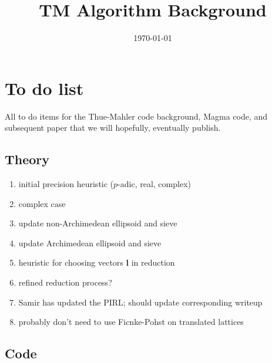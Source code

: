 \documentclass[11pt]{report}
\title{TM Algorithm Background}
\author{}
\date{\today}
\theoremstyle{definition}
\begin{document}
\maketitle
\tableofcontents


\chapter{To do list}
\label{cha:do-list}

All to do items for the Thue-Mahler code background, Magma code, and subsequent paper that we will hopefully, eventually publish.


\section{Theory}
\label{sec:theory}

\begin{enumerate}[\hspace{0.5cm}1.]
\itemsep0em
\item initial precision heuristic ($p$-adic, real, complex)
\item complex case
\item update non-Archimedean ellipsoid and sieve
\item update Archimedean ellipsoid and sieve
\item heuristic for choosing vectors $\mathbf{l}$ in reduction
\item refined reduction process?
\item Samir has updated the PIRL; should update corresponding writeup
\item probably don't need to use Ficnke-Pohst on translated lattices
\end{enumerate}


\section{Code}
\label{sec:code}
\end{document}
